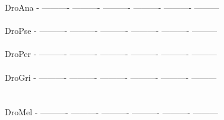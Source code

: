 \documentclass[11pt,twoside,reqno,a4paper]{article}
\begin{document}
{DroAna	-	----------	----------	----------	----------	----------	---------\\
\hspace*{7\charwidth}\hspace*{1\charwidth}\hspace*{1\charwidth}\hspace*{1\charwidth}\hspace*{1\charwidth}\hspace*{1\charwidth}\hspace*{1\charwidth}\\
DroPse	-	----------	----------	----------	----------	----------	---------\\
\hspace*{7\charwidth}\hspace*{1\charwidth}\hspace*{1\charwidth}\hspace*{1\charwidth}\hspace*{1\charwidth}\hspace*{1\charwidth}\hspace*{1\charwidth}\\
DroPer	-	----------	----------	----------	----------	----------	---------\\
\hspace*{7\charwidth}\hspace*{1\charwidth}\hspace*{1\charwidth}\hspace*{1\charwidth}\hspace*{1\charwidth}\hspace*{1\charwidth}\hspace*{1\charwidth}\\
DroGri	-	----------	----------	----------	----------	----------	---------\\
\hspace*{7\charwidth}\hspace*{1\charwidth}\hspace*{1\charwidth}\hspace*{1\charwidth}\hspace*{1\charwidth}\hspace*{1\charwidth}\hspace*{1\charwidth}\\
\\
DroMel	-	----------	----------	----------	----------	----------	---------\\
\hspace*{7\charwidth}\hspace*{1\charwidth}\hspace*{1\charwidth}\hspace*{1\charwidth}\hspace*{1\charwidth}\hspace*{1\charwidth}\hspace*{1\charwidth}\\
}
\end{document}
